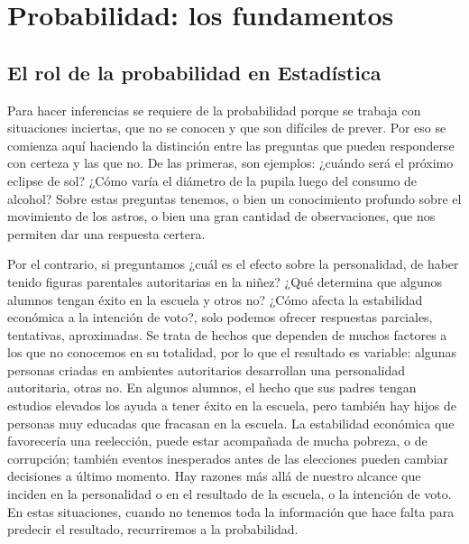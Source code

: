\documentclass[]{article}
\title{}
\author{}
\date{}
\begin{document}
\hypertarget{probabilidad-los-fundamentos}{%
\section{Probabilidad: los
fundamentos}\label{probabilidad-los-fundamentos}}

\hypertarget{el-rol-de-la-probabilidad-en-estaduxedstica}{%
\subsection{El rol de la probabilidad en
Estadística}\label{el-rol-de-la-probabilidad-en-estaduxedstica}}

Para hacer inferencias se requiere de la probabilidad porque se trabaja
con situaciones inciertas, que no se conocen y que son difíciles de
prever. Por eso se comienza aquí haciendo la distinción entre las
preguntas que pueden responderse con certeza y las que no. De las
primeras, son ejemplos: ¿cuándo será el próximo eclipse de sol? ¿Cómo
varía el diámetro de la pupila luego del consumo de alcohol? Sobre estas
preguntas tenemos, o bien un conocimiento profundo sobre el movimiento
de los astros, o bien una gran cantidad de observaciones, que nos
permiten dar una respuesta certera.

Por el contrario, si preguntamos ¿cuál es el efecto sobre la
personalidad, de haber tenido figuras parentales autoritarias en la
niñez? ¿Qué determina que algunos alumnos tengan éxito en la escuela y
otros no? ¿Cómo afecta la estabilidad económica a la intención de voto?,
solo podemos ofrecer respuestas parciales, tentativas, aproximadas. Se
trata de hechos que dependen de muchos factores a los que no conocemos
en su totalidad, por lo que el resultado es variable: algunas personas
criadas en ambientes autoritarios desarrollan una personalidad
autoritaria, otras no. En algunos alumnos, el hecho que sus padres
tengan estudios elevados los ayuda a tener éxito en la escuela, pero
también hay hijos de personas muy educadas que fracasan en la escuela.
La estabilidad económica que favorecería una reelección, puede estar
acompañada de mucha pobreza, o de corrupción; también eventos
inesperados antes de las elecciones pueden cambiar decisiones a último
momento. Hay razones más allá de nuestro alcance que inciden en la
personalidad o en el resultado de la escuela, o la intención de voto. En
estas situaciones, cuando no tenemos toda la información que hace falta
para predecir el resultado, recurriremos a la probabilidad.
\end{document}
